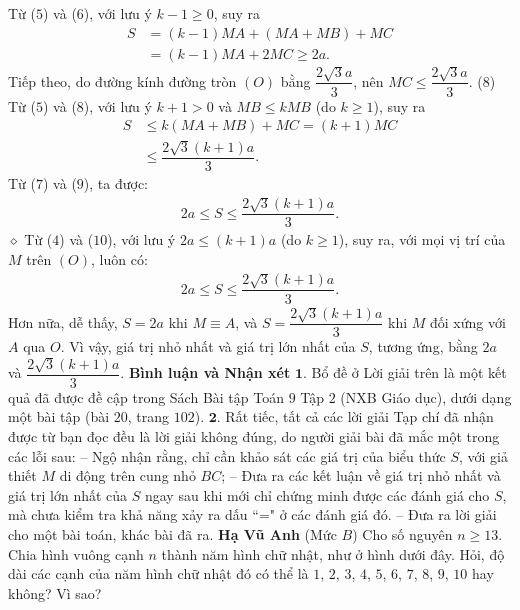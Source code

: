 \begin{multicols}{2}
	\vskip 0.05cm
	Từ ($5$) và ($6$), với lưu ý $k - 1 \ge 0$, suy ra
	\begin{align*}
		S &= (k - 1)MA + (MA + MB) + MC \\
		&= (k - 1)MA + 2MC \ge 2a.                      \tag{$7$}
	\end{align*}
	Tiếp theo, do đường kính đường tròn $(O)$ bằng $\dfrac{2\sqrt{3}a}{3}$, nên  $MC \le \dfrac{2\sqrt{3}a}{3}$. \hfill ($8$)
	\vskip 0.05cm
	Từ ($5$) và ($8$), với lưu ý $k + 1 > 0$ và $MB \le kMB$ (do $k \ge 1$), suy ra
	\begin{align*}
		S &\le k\left( {MA + MB} \right) + MC = \left( {k + 1} \right)MC \\
		&\le \dfrac{{2\sqrt 3 \left( {k + 1} \right)a}}{3}. \tag{$9$}
	\end{align*}
	Từ ($7$) và ($9$), ta được:
	\begin{align*}
		2a \le S \le \dfrac{{2\sqrt 3 \left( {k + 1} \right)a}}{3}. \tag{$10$}
	\end{align*}
	$\diamond$ Từ ($4$) và ($10$), với lưu ý $2a \le (k + 1)a$ (do $k \ge 1$), suy ra, với mọi vị trí của $M$ trên $(O)$, luôn có:
	\begin{align*}
		2a \le S \le \dfrac{{2\sqrt 3 \left( {k + 1} \right)a}}{3}. 
	\end{align*}
	Hơn nữa, dễ thấy, $S = 2a$ khi $M \equiv A$, và $S = \dfrac{{2\sqrt 3 \left( {k + 1} \right)a}}{3}$  khi $M$ đối xứng với $A$ qua $O$.
	\vskip 0.05cm
	Vì vậy, giá trị nhỏ nhất và giá trị lớn nhất của $S$, tương ứng, bằng $2a$ và $\dfrac{{2\sqrt 3 \left( {k + 1} \right)a}}{3}$.
	\vskip 0.05cm
	\textbf{\color{thachthuctoanhoc}Bình luận và Nhận xét}
	\vskip 0.05cm
	$\pmb{1.}$ Bổ đề ở Lời giải trên là một kết quả đã được đề cập trong Sách Bài tập Toán $9$ Tập $2$ (NXB Giáo dục), dưới dạng một bài tập (bài $20$, trang $102$).
	\vskip 0.05cm
	$\pmb{2.}$ Rất tiếc, tất cả các lời giải Tạp chí đã nhận được từ bạn đọc đều là lời giải không đúng, do người giải bài đã mắc một trong các lỗi sau:
	\vskip 0.05cm
	-- Ngộ nhận rằng, chỉ cần khảo sát các giá trị của biểu thức $S$, với giả thiết $M$ di động trên cung nhỏ $BC$;
	\vskip 0.05cm
	-- Đưa ra các kết luận về giá trị nhỏ nhất và giá trị lớn nhất của $S$ ngay sau khi mới chỉ chứng minh được các đánh giá cho $S$, mà chưa kiểm tra khả năng xảy ra dấu ``=" ở các đánh giá đó.
	\vskip 0.05cm
	-- Đưa ra lời giải cho một bài toán, khác bài đã ra.
	\vskip 0.05cm
	\hfill \textbf{\color{thachthuctoanhoc}Hạ Vũ Anh}
	\vskip 0.05cm
	{}
	(Mức $B$) Cho số nguyên $n\ge 13$. Chia hình vuông cạnh $n$ thành năm hình chữ nhật, như ở hình dưới đây. Hỏi, độ dài các cạnh của năm hình chữ nhật đó có thể là $1$, $2$, $3$, $4$, $5$, $6$, $7$, $8$, $9$, $10$ hay không? Vì sao?

\end{multicols}

